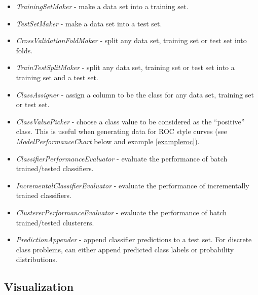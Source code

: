 \begin{itemize}
	\item \textit{TrainingSetMaker} - make a data set into a training set.
	\item \textit{TestSetMaker} - make a data set into a test set.
	\item \textit{CrossValidationFoldMaker} - split any data set, training 
	set or test set into folds.
	\item \textit{TrainTestSplitMaker} - split any data set, training set 
	or test set into a training set and a test set.
	\item \textit{ClassAssigner} - assign a column to be the class for any 
	data set, training set or test set.
	\item \textit{ClassValuePicker} - choose a class value to be considered 
	as the ``positive'' class. This is useful when generating data for ROC style 
	curves (see \textit{ModelPerformanceChart} below and example \ref{exampleroc}).
	\item \textit{ClassifierPerformanceEvaluator} - evaluate the performance of 
	batch trained/tested classifiers.
	\item \textit{IncrementalClassifierEvaluator} - evaluate the performance of 
	incrementally trained classifiers.
	\item \textit{ClustererPerformanceEvaluator} - evaluate the performance of 
	batch trained/tested clusterers.
	\item \textit{PredictionAppender} - append classifier predictions to a test 
	set. For discrete class problems, can either append predicted class labels or
	probability distributions.
\end{itemize}

\newpage
\subsection{Visualization}
\begin{center}
\end{center}

